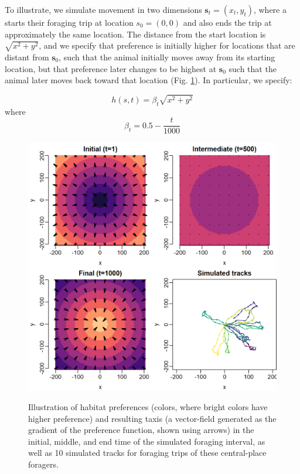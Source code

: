To illustrate, we simulate movement in two dimensions \(\mathbf{s}_t = (x_t,y_t)\), where a  starts their foraging trip at location \(s_0 = (0,0)\) and also ends the trip at approximately the same location.  The distance from the start location is \( \sqrt{x^2+y^2} \), and we specify that preference is initially higher for locations that are distant from \(\mathbf{s}_0\), such that the animal initially moves away from its starting location, but that preference later changes to be highest at \(\mathbf{s}_0\) such that the animal later moves back toward that location (Fig. \ref{fig:Chap4_simulation}).  In particular, we specify:

\begin{equation}
    h(s,t) = \beta_t \sqrt{x^2+y^2}    
\end{equation}
where
\begin{equation}
    \beta_t = 0.5 - \frac{t}{1000}    
\end{equation}

\lstset{style=Rcode}


\begin{figure}[!ht]
    \caption[Simulated movement for central-place forager]{Illustration of habitat preferences (colors, where bright colors have higher preference) and resulting taxis (a vector-field generated as the gradient of the preference function, shown using arrows) in the initial, middle, and end time of the simulated foraging interval, as well as 10 simulated tracks for foraging trips of these central-place foragers.}
    \centering
    \includegraphics[width=5.5in]{Chap_4/Preference.png}
    \label{fig:Chap4_simulation}
\end{figure}

